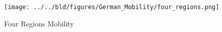 \documentclass[11pt, a4paper, leqno]{article}
\begin{document}
\begin{figure}[t!]
	\centering
	\texttt{[image: ../../bld/figures/German\_Mobility/four\_regions.png]}
	\caption{Four Regions Mobility}
\end{figure}







\clearpage

\printbibliography
{}





\end{document}
